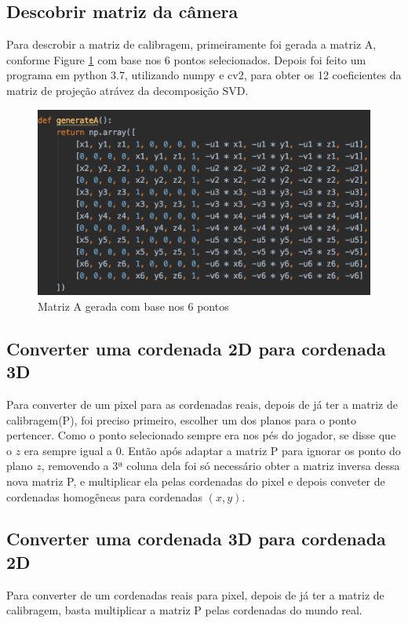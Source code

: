 \documentclass{article}
\begin{document}
    \subsection{Descobrir matriz da câmera}
    Para descrobir a matriz de calibragem, primeiramente foi gerada a matriz A, conforme Figure \ref{fig:matrizA1}  com base nos 6 pontos selecionados. Depois foi feito um programa em python 3.7, utilizando numpy e cv2, para obter os 12 coeficientes da matriz de projeção atrávez da decomposição SVD.
        \begin{figure}[h!]
            \centering
            \includegraphics[scale=0.6]{matrizA1.png}
            \caption{Matriz A gerada com base nos 6 pontos}
            \label{fig:matrizA1}
        \end{figure}

    \subsection{Converter uma cordenada 2D para cordenada 3D}
    Para converter de um pixel para as cordenadas reais, depois de já ter a matriz de calibragem(P), foi preciso primeiro, escolher um dos planos para o ponto pertencer. Como o ponto selecionado sempre era nos pés do jogador, se disse que o \(z\) era sempre igual a 0. Então após adaptar a matriz P para ignorar os ponto do plano \(z\), removendo a 3ª coluna dela foi só necessário obter a matriz inversa dessa nova matriz P, e multiplicar ela pelas cordenadas do pixel e depois conveter de cordenadas homogêneas para cordenadas  \((x, y)\).

    \subsection{Converter uma cordenada 3D para cordenada 2D}
    Para converter de um cordenadas reais para pixel, depois de já ter a matriz de calibragem, basta multiplicar a matriz P pelas cordenadas do mundo real.
\end{document}
